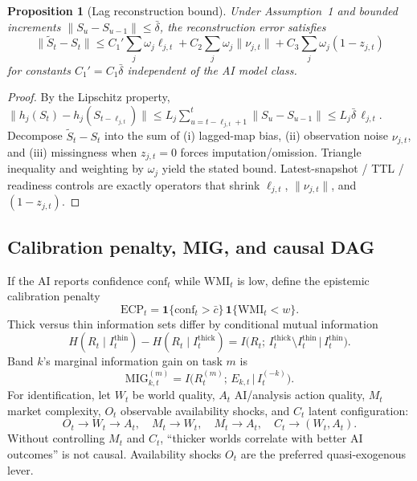 \documentclass[12pt]{article}
\newtheorem{proposition}{Proposition}
\begin{document}
\begin{proposition}[Lag reconstruction bound]
\label{prop:recon}
Under Assumption~1 and bounded increments $\|S_u-S_{u-1}\|\le \bar\delta$, the reconstruction error satisfies
\[
\|\widetilde S_t-S_t\|
\le C_1'\sum_j\omega_j\ell_{j,t}
+C_2\sum_j\omega_j\|\nu_{j,t}\|
+C_3\sum_j\omega_j(1-z_{j,t})
\]
for constants $C_1'=C_1\bar\delta$ independent of the AI model class.
\end{proposition}
\begin{proof}
By the Lipschitz property,
$\|h_j(S_t)-h_j(S_{t-\ell_{j,t}})\|\le L_j\sum_{u=t-\ell_{j,t}+1}^{t}\|S_u-S_{u-1}\|\le L_j\bar\delta\,\ell_{j,t}$.
Decompose $\widetilde S_t-S_t$ into the sum of (i) lagged-map bias, (ii) observation noise $\nu_{j,t}$, and (iii) missingness when $z_{j,t}=0$ forces imputation/omission. Triangle inequality and weighting by $\omega_j$ yield the stated bound. Latest-snapshot / TTL / readiness controls are exactly operators that shrink $\ell_{j,t}$, $\|\nu_{j,t}\|$, and $(1-z_{j,t})$.
\end{proof}

\subsection{Calibration penalty, MIG, and causal DAG}
If the AI reports confidence $\mathrm{conf}_t$ while $\mathrm{WMI}_t$ is low, define the epistemic calibration penalty
\begin{equation}
\mathrm{ECP}_t=\mathbf{1}\{\mathrm{conf}_t>\bar c\}\,\mathbf{1}\{\mathrm{WMI}_t<w\}.
\label{eq:ecp}
\end{equation}
Thick versus thin information sets differ by conditional mutual information
\begin{equation}
H(R_t\mid I^{\mathrm{thin}}_t)-H(R_t\mid I^{\mathrm{thick}}_t)
=I\!\bigl(R_t;\,I^{\mathrm{thick}}_t\setminus I^{\mathrm{thin}}_t\,\big|\,I^{\mathrm{thin}}_t\bigr).
\label{eq:thickthin}
\end{equation}
Band $k$'s marginal information gain on task $m$ is
\begin{equation}
\mathrm{MIG}^{(m)}_{k,t}=I\!\bigl(R^{(m)}_t;\,E_{k,t}\,\big|\,I^{(-k)}_t\bigr).
\label{eq:mig}
\end{equation}
For identification, let $W_t$ be world quality, $A_t$ AI/analysis action quality, $M_t$ market complexity, $O_t$ observable availability shocks, and $C_t$ latent configuration:
\begin{equation}
O_t\to W_t\to A_t,\quad
M_t\to W_t,\quad
M_t\to A_t,\quad
C_t\to (W_t,A_t).
\label{eq:dag}
\end{equation}
Without controlling $M_t$ and $C_t$, ``thicker worlds correlate with better AI outcomes'' is not causal. Availability shocks $O_t$ are the preferred quasi-exogenous lever.
\end{document}
